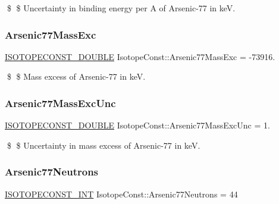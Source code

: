 \$ \$ Uncertainty in binding energy per A of Arsenic-\/77 in keV. \mbox{\label{group___isotope_const-_arsenic-_as77_ga3a0dadfdb2311c3faf40ef374dcb7b34}} 
\subsubsection{\texorpdfstring{Arsenic77\+Mass\+Exc}{Arsenic77MassExc}}
{\footnotesize\ttfamily \mbox{\hyperlink{group___isotope_const-_macros_ga8f45a7272ce02c0b4c65c44636ed719a}{I\+S\+O\+T\+O\+P\+E\+C\+O\+N\+S\+T\+\_\+\+D\+O\+U\+B\+LE}} Isotope\+Const\+::\+Arsenic77\+Mass\+Exc = -\/73916.}

\$ \$ Mass excess of Arsenic-\/77 in keV. \mbox{\label{group___isotope_const-_arsenic-_as77_ga253aa70470b3a22875205bbe99faf29c}} 
\subsubsection{\texorpdfstring{Arsenic77\+Mass\+Exc\+Unc}{Arsenic77MassExcUnc}}
{\footnotesize\ttfamily \mbox{\hyperlink{group___isotope_const-_macros_ga8f45a7272ce02c0b4c65c44636ed719a}{I\+S\+O\+T\+O\+P\+E\+C\+O\+N\+S\+T\+\_\+\+D\+O\+U\+B\+LE}} Isotope\+Const\+::\+Arsenic77\+Mass\+Exc\+Unc = 1.}

\$ \$ Uncertainty in mass excess of Arsenic-\/77 in keV. \mbox{\label{group___isotope_const-_arsenic-_as77_ga5359124cd8b49e095d969888f931a74f}} 
\subsubsection{\texorpdfstring{Arsenic77\+Neutrons}{Arsenic77Neutrons}}
{\footnotesize\ttfamily \mbox{\hyperlink{group___isotope_const-_macros_ga5f18360b3e99483a35c32d789e62621c}{I\+S\+O\+T\+O\+P\+E\+C\+O\+N\+S\+T\+\_\+\+I\+NT}} Isotope\+Const\+::\+Arsenic77\+Neutrons = 44}

